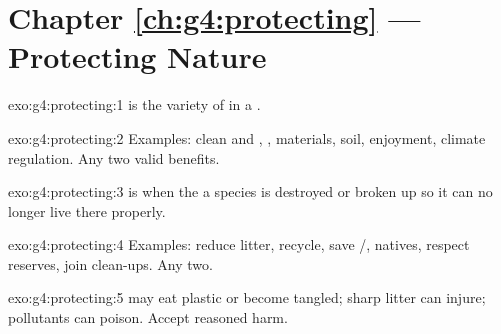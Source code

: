 \section*{Chapter \ref{ch:g4:protecting} --- Protecting Nature}

\begin{solution}{exo:g4:protecting:1}
 is the variety of  in a .
\end{solution}

\begin{solution}{exo:g4:protecting:2}
Examples: clean  and , , materials, soil, enjoyment,
climate regulation. Any two valid benefits.
\end{solution}

\begin{solution}{exo:g4:protecting:3}
 is when the  a species  is destroyed or broken
up so it can no longer live there properly.
\end{solution}

\begin{solution}{exo:g4:protecting:4}
Examples: reduce litter, recycle, save /,  natives,
respect reserves, join clean-ups. Any two.
\end{solution}

\begin{solution}{exo:g4:protecting:5}
 may eat plastic or become tangled; sharp litter can injure;
pollutants can poison. Accept reasoned harm.
\end{solution}

